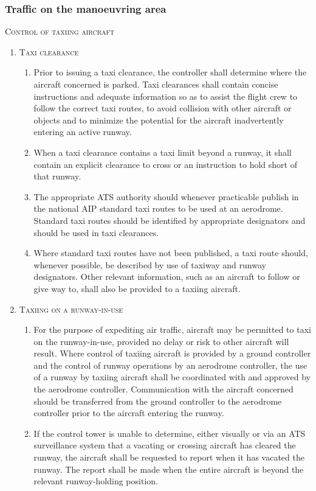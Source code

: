 \subsubsection{Traffic on the manoeuvring area}

\begin{enumeratesc}
    \item \textsc{Control of taxiing aircraft}
    \begin{enumerate}[labelindent=0pt,itemsep=0.2cm]
        \item \textsc{Taxi clearance}
        \begin{enumerate}
            \item Prior to issuing a taxi clearance, the controller shall determine where the aircraft concerned is parked. Taxi clearances shall contain concise instructions and adequate information so as to assist the flight crew to follow the correct taxi routes, to avoid collision with other aircraft or objects and to minimize the potential for the aircraft inadvertently entering an active runway.
            \item When a taxi clearance contains a taxi limit beyond a runway, it shall contain an explicit clearance to cross or an instruction to hold short of that runway.
            \item The appropriate ATS authority should whenever practicable publish in the national AIP standard taxi routes to be used at an aerodrome. Standard taxi routes should be identified by appropriate designators and should be used in taxi clearances.
            \item Where standard taxi routes have not been published, a taxi route should, whenever possible, be described by use of taxiway and runway designators. Other relevant information, such as an aircraft to follow or give way to, shall also be provided to a taxiing aircraft.
        \end{enumerate}

        \item \textsc{Taxiing on a runway-in-use}
        \begin{enumerate}
            \item For the purpose of expediting air traffic, aircraft may be permitted to taxi on the runway-in-use, provided no delay or risk to other aircraft will result. Where control of taxiing aircraft is provided by a ground controller and the control of runway operations by an aerodrome controller, the use of a runway by taxiing aircraft shall be coordinated with and approved by the aerodrome controller. Communication with the aircraft concerned should be transferred from the ground controller to the aerodrome controller prior to the aircraft entering the runway.
            \item \label{7.6.3.1.2.2} If the control tower is unable to determine, either visually or via an ATS surveillance system that a vacating or crossing aircraft has cleared the runway, the aircraft shall be requested to report when it has vacated the runway. The report shall be made when the entire aircraft is beyond the relevant runway-holding position.
        \end{enumerate}


\end{enumerate}
\end{enumeratesc}
